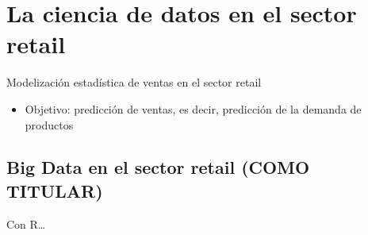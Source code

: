 \documentclass[12pt,a4paper,]{book}
\def\ifdoblecara{} %
\def\ifprincipal{} %
\providecommand{\tightlist}{%
  \setlength{\itemsep}{0pt}\setlength{\parskip}{0pt}}
\numberwithin{dummy}{section}
\theoremstyle{ocrenumbox}
\theoremstyle{blacknumex}
\theoremstyle{blacknumbox}
\theoremstyle{ocrenum}
\theoremstyle{ocrenum}
\begin{document}
\renewcommand{\headrulewidth}{0.4pt}
\renewcommand{\footrulewidth}{0.4pt}

\ifdefined\ifprincipal
\else
\setlength{\parindent}{1em}
\pagestyle{fancy}
\setcounter{tocdepth}{4}
\tableofcontents

\fi

\ifdefined\ifdoblecara
\fancyhead{}{}
\fancyhead[LE,RO]{\scriptsize\rightmark}
\fancyfoot[LO,RE]{\scriptsize\slshape \leftmark}
\fancyfoot[C]{}
\fancyfoot[LE,RO]{\footnotesize\thepage}
\else
\fancyhead{}{}
\fancyhead[RO]{\scriptsize\rightmark}
\fancyfoot[LO]{\scriptsize\slshape \leftmark}
\fancyfoot[C]{}
\fancyfoot[RO]{\footnotesize\thepage}
\fi
\renewcommand{\headrulewidth}{0.4pt}
\renewcommand{\footrulewidth}{0.4pt}

\hypertarget{la-ciencia-de-datos-en-el-sector-retail}{%
\chapter{La ciencia de datos en el sector
retail}\label{la-ciencia-de-datos-en-el-sector-retail}}

Modelización estadística de ventas en el sector retail

\begin{itemize}
\tightlist
\item
  Objetivo: predicción de ventas, es decir, predicción de la demanda de
  productos
\end{itemize}

\hypertarget{big-data-en-el-sector-retail-como-titular}{%
\section{Big Data en el sector retail (COMO
TITULAR)}\label{big-data-en-el-sector-retail-como-titular}}

Con R\ldots{}

\FloatBarrier

\ifdefined\ifprincipal
\else
\setlength{\parindent}{1em}
\pagestyle{fancy}
\setcounter{tocdepth}{4}
\tableofcontents

\fi

\ifdefined\ifdoblecara
\fancyhead{}{}
\fancyhead[LE,RO]{\scriptsize\rightmark}
\fancyfoot[LO,RE]{\scriptsize\slshape \leftmark}
\fancyfoot[C]{}
\fancyfoot[LE,RO]{\footnotesize\thepage}
\else
\fancyhead{}{}
\fancyhead[RO]{\scriptsize\rightmark}
\fancyfoot[LO]{\scriptsize\slshape \leftmark}
\fancyfoot[C]{}
\fancyfoot[RO]{\footnotesize\thepage}
\fi
\renewcommand{\headrulewidth}{0.4pt}
\renewcommand{\footrulewidth}{0.4pt}
\end{document}
